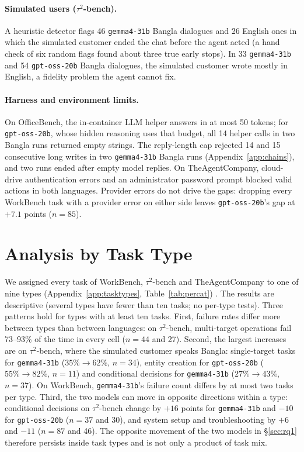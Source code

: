 \documentclass[11pt]{article}
\newif\ifshowverify
\newcommand{\verify}[1]{\ifshowverify{\color{red}\,[VERIFY: #1]}\fi}
\newcommand{\gemma}{\texttt{gemma4-31b}}
\newcommand{\gptoss}{\texttt{gpt-oss-20b}}
\newcommand{\OB}{OfficeBench}
\newcommand{\WB}{WorkBench}
\newcommand{\TAU}{$\tau^2$-bench}
\newcommand{\TAC}{TheAgentCompany}
\begin{document}
\paragraph{Simulated users (\TAU{}).} A heuristic detector flags 46 \gemma{} Bangla dialogues and
26 English ones in which the simulated customer ended the chat before the agent acted (a hand check
of six random flags found about three true early stops). In 33 \gemma{} and 54 \gptoss{} Bangla
dialogues, the simulated customer wrote mostly in English, a fidelity problem the agent cannot fix.

\paragraph{Harness and environment limits.} On \OB{}, the in-container LLM helper answers in at most
50 tokens; for \gptoss{}, whose hidden reasoning uses that budget, all 14 helper calls in two Bangla
runs returned empty strings. The reply-length cap rejected 14 and 15 consecutive long writes in two
\gemma{} Bangla runs (Appendix~\ref{app:chains}), and two runs ended after empty model replies. On
\TAC{}, cloud-drive authentication errors and an administrator password prompt blocked valid actions
in both languages. Provider errors do not drive the gaps: dropping every \WB{} task with a
provider error on either side leaves \gptoss{}'s gap at $+7.1$ points ($n=85$).

\section{Analysis by Task Type}
\label{sec:tasktypes}

We assigned every task of \WB{}, \TAU{} and \TAC{} to one of nine types (Appendix~\ref{app:tasktypes},
Table~\ref{tab:percat}) \verify{who assigned types and how}. The results are descriptive
(several types have fewer than ten tasks; no per-type tests). Three patterns hold for types with at
least ten tasks. First, failure rates differ more between types than between languages: on
\TAU{}, multi-target operations fail 73--93\% of the time in every cell ($n=44$ and 27). Second,
the largest increases are on \TAU{}, where the simulated customer speaks Bangla: single-target
tasks for \gemma{} ($35\%\to62\%$, $n=34$), entity creation for \gptoss{} ($55\%\to82\%$, $n=11$)
and conditional decisions for \gemma{} ($27\%\to43\%$, $n=37$). On \WB{}, \gemma{}'s failure
count differs by at most two tasks per type. Third, the two models can move in opposite directions
within a type: conditional decisions on \TAU{} change by $+16$ points for \gemma{} and $-10$ for
\gptoss{} ($n=37$ and 30), and system setup and troubleshooting by $+6$ and $-11$ ($n=87$ and
46). The opposite movement of the two models in \S\ref{sec:rq1} therefore persists inside task
types and is not only a product of task mix.
\end{document}

